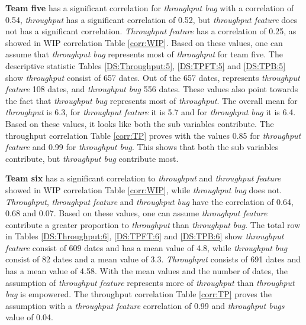 \documentclass[UKenglish]{ifimaster}  %
\begin{document}
\textbf{Team five} has a significant correlation for \textit{throughput bug} with a correlation of 0.54, \textit{throughput} has a significant  correlation of 0.52, but \textit{throughput feature} does not has a significant correlation. \textit{Throughput feature} has a correlation of 0.25, as showed in WIP correlation Table \ref{corr:WIP}. Based on these values, one can assume that \textit{throughput bug} represents most of \textit{throughput} for team five. The descriptive statistic Tables \ref{DS:Throughput:5}, \ref{DS:TPFT:5} and \ref{DS:TPB:5} show \textit{throughput} consist of 657 dates. Out of the 657 dates, represents \textit{throughput feature} 108 dates, and \textit{throughput bug} 556 dates. These values also point towards the fact that \textit{throughput bug} represents most of \textit{throughput}. The overall mean for \textit{throughput} is 6.3, for \textit{throughput feature} it is 5.7 and for \textit{throughput bug} it is 6.4. Based on these values, it looks like both the sub variables contribute. The throughput correlation Table \ref{corr:TP} proves with the values 0.85 for \textit{throughput feature} and 0.99 for \textit{throughput bug}. This shows that both the sub variables contribute, but \textit{throughput bug} contribute most.



\textbf{Team six} has a significant correlation to \textit{throughput} and \textit{throughput feature} showed in WIP correlation Table \ref{corr:WIP}, while \textit{throughput bug} does not. \textit{Throughput}, \textit{throughput feature} and \textit{throughput bug} have the correlation of 0.64, 0.68 and 0.07. Based on these values, one can assume \textit{throughput feature} contribute a greater proportion to \textit{throughput} than \textit{throughput bug}. The total row in Tables \ref{DS:Throughput:6},  \ref{DS:TPFT:6} and \ref{DS:TPB:6} show \textit{throughput feature} consist of 609 dates and has a mean value of 4.8, while \textit{throughput bug} consist of 82 dates  and a mean value of 3.3. \textit{Throughput} consists of 691 dates and has a mean value of 4.58. With the mean values and the number of dates, the assumption of \textit{throughput feature} represents more of \textit{throughput} than \textit{throughput bug} is empowered. The throughput correlation Table \ref{corr:TP} proves the assumption with a \textit{throughput feature}  correlation of 0.99 and \textit{throughput bugs}  value of 0.04. 
\end{document}
